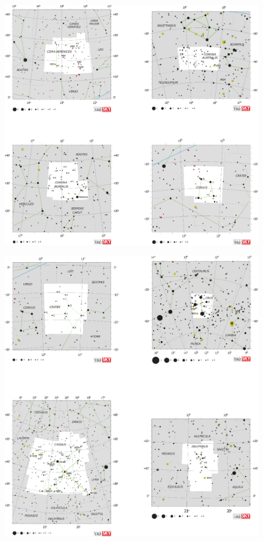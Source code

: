 \documentclass[a4paper,12pt]{extarticle}
\begin{document}
\clearpage
\begin{figure}
    \centering
    \includegraphics[width=\linewidth]{C7.eps}
\end{figure}
\clearpage
\begin{figure}
    \centering
    \includegraphics[width=\linewidth]{C8.eps}
\end{figure}
\end{document}
